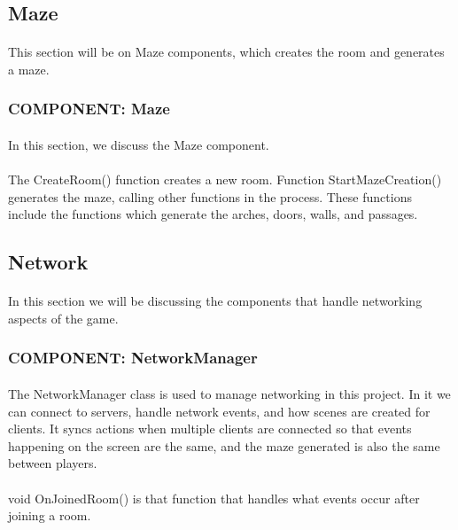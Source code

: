 \documentclass[12pt, titlepage]{article}
\begin{document}
\subsection{Maze}
\paragraph{} This section will be on Maze components, which creates the room and generates a maze.
\subsubsection{COMPONENT: Maze}
\paragraph{}In this section, we discuss the Maze component. 
\paragraph{} The CreateRoom() function creates a new room. Function StartMazeCreation() generates the maze, calling other functions in the process. These functions include the functions which generate the arches, doors, walls, and passages.
\subsection{Network}
\paragraph{} In this section we will be discussing the components that handle networking aspects of the game.
\subsubsection{COMPONENT: NetworkManager}
\paragraph{} The NetworkManager class is used to manage networking in this project. In it we can connect to servers, handle network events, and how scenes are created for clients. It syncs actions when multiple clients are connected so that events happening on the screen are the same, and the maze generated is also the same between players.
\paragraph{} void OnJoinedRoom() is that function that handles what events occur after joining a room.
\end{document}
